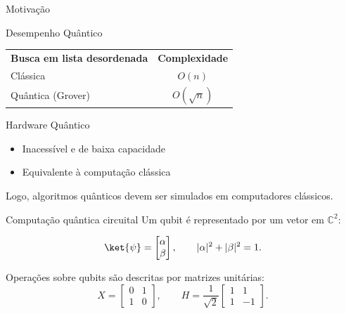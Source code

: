 \documentclass{beamer}
\begin{document}
\capa

\begin{frame}{Motivação}
  \begin{block}{Desempenho Quântico}
    \centering
    \begin{tabular}{lc}
      \textbf{Busca em lista desordenada} & \textbf{Complexidade} \\
      Clássica & $O(n)$ \\
      Quântica (Grover) & $O(\sqrt{n})$
    \end{tabular}
  \end{block}

  \begin{block}{Hardware Quântico}
    \begin{itemize}
      \item Inacessível e de baixa capacidade
      \item Equivalente à computação clássica
    \end{itemize}
  \end{block}

  Logo, algoritmos quânticos devem ser simulados em computadores clássicos.
\end{frame}

\begin{frame}{Computação quântica circuital}
  Um qubit é representado por um vetor em $\mathbb{C}^{2}$:

  \[
    \ket{\psi}
    =
    \begin{bmatrix}
      \alpha \\
      \beta
    \end{bmatrix},
    \qquad
    |\alpha|^{2}+|\beta|^{2}=1.
  \]

  Operações sobre qubits são descritas por matrizes unitárias:
  \[
    X=
    \begin{bmatrix}
      0&1\\
      1&0
    \end{bmatrix},
    \qquad
    H=\frac{1}{\sqrt{2}}
    \begin{bmatrix}
      1&1\\
      1&-1
    \end{bmatrix}.
  \]
\end{frame}
\end{document}
